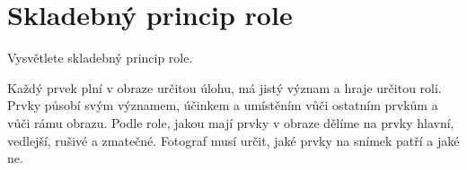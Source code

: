 \section{Skladebný princip role}
Vysvětlete skladebný princip role.

Každý prvek plní v obraze určitou úlohu, má jistý význam a hraje určitou roli. Prvky působí svým významem, účinkem a 
umístěním vůči ostatním prvkům a vůči rámu obrazu. Podle role, jakou mají prvky v obraze dělíme na prvky hlavní, 
vedlejší, rušivé a zmatečné. Fotograf musí určit, jaké prvky na snímek patří a jaké ne.
